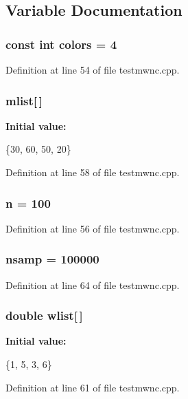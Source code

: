 \subsection{Variable Documentation}
\subsubsection[{colors}]{\setlength{\rightskip}{0pt plus 5cm}const int colors = 4}\label{rnd_2testmwnc_8cpp_a3d13a5292cc6f3ed866f7d30b7ac3d06}


Definition at line 54 of file testmwnc.\-cpp.

\subsubsection[{mlist}]{ mlist[$\,$]}\label{rnd_2testmwnc_8cpp_ac30a614d36a3ccd2657a4be3eaf6b102}
{\bfseries Initial value\-:}
\begin{DoxyCode}
 
  \{30, 60, 50, 20\}
\end{DoxyCode}


Definition at line 58 of file testmwnc.\-cpp.

\subsubsection[{n}]{ n = 100}\label{rnd_2testmwnc_8cpp_a4e34aefb3cc5403a07c020131077100a}


Definition at line 56 of file testmwnc.\-cpp.

\subsubsection[{nsamp}]{ nsamp = 100000}\label{rnd_2testmwnc_8cpp_a276446f64722a73896fc821be0e6adf2}


Definition at line 64 of file testmwnc.\-cpp.

\subsubsection[{wlist}]{\setlength{\rightskip}{0pt plus 5cm}double wlist[$\,$]}\label{rnd_2testmwnc_8cpp_a0f9888e52a4c32fd392577b5e258d45b}
{\bfseries Initial value\-:}
\begin{DoxyCode}
 
  \{1, 5, 3, 6\}
\end{DoxyCode}


Definition at line 61 of file testmwnc.\-cpp.

